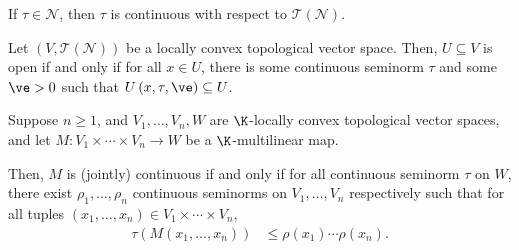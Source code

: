 \documentclass[10pt]{mypackage}
\begin{document}
\begin{remark}
  If $\tau\in \mathcal{N}$, then $\tau$ is continuous with respect to $ \mathcal{T}\left( \mathcal{N} \right) $.
\end{remark}
\begin{proposition}
  Let $\left( V, \mathcal{T}\left( \mathcal{N} \right) \right)$ be a locally convex topological vector space. Then, $U\subseteq V$ is open if and only if for all $x\in U$, there is some continuous seminorm $\tau$ and some $\ve > 0$ such that $U\left( x,\tau,\ve \right)\subseteq U$.
\end{proposition}
\begin{theorem}
  Suppose $n\geq 1$, and $V_1,\dots,V_n,W$ are $\K$-locally convex topological vector spaces, and let $M\colon V_1\times\cdots\times V_n\rightarrow W$ be a $\K$-multilinear map.

  Then, $M$ is (jointly) continuous if and only if for all continuous seminorm $\tau$ on $W$, there exist $\rho_1,\dots,\rho_n$ continuous seminorms on $V_1,\dots,V_n$ respectively such that for all tuples $\left( x_1,\dots,x_n \right)\in V_1\times\cdots\times V_n$,
  \begin{align*}
    \tau\left( M\left( x_1,\dots,x_n \right) \right) &\leq \rho\left( x_1 \right)\cdots\rho\left( x_n \right).\label{eq:continuous_multilinear_map}\tag{$\dag$}
  \end{align*}
\end{theorem}
\end{document}
